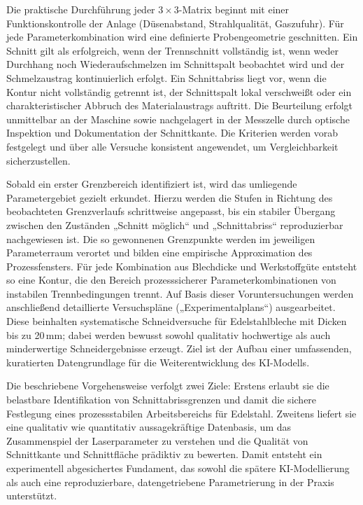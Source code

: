 Die praktische Durchführung jeder $3\times 3$-Matrix beginnt mit einer Funktionskontrolle der Anlage (Düsenabstand, Strahlqualität, Gaszufuhr). Für jede Parameterkombination wird eine definierte Probengeometrie geschnitten. Ein Schnitt gilt als erfolgreich, wenn der Trennschnitt vollständig ist, wenn weder Durchhang noch Wiederaufschmelzen im Schnittspalt beobachtet wird und der Schmelzaustrag kontinuierlich erfolgt. Ein Schnittabriss liegt vor, wenn die Kontur nicht vollständig getrennt ist, der Schnittspalt lokal verschweißt oder ein charakteristischer Abbruch des Materialaustrags auftritt. Die Beurteilung erfolgt unmittelbar an der Maschine sowie nachgelagert in der Messzelle durch optische Inspektion und Dokumentation der Schnittkante. Die Kriterien werden vorab festgelegt und über alle Versuche konsistent angewendet, um Vergleichbarkeit sicherzustellen.

Sobald ein erster Grenzbereich identifiziert ist, wird das umliegende Parametergebiet gezielt erkundet. Hierzu werden die Stufen in Richtung des beobachteten Grenzverlaufs schrittweise angepasst, bis ein stabiler Übergang zwischen den Zuständen „Schnitt möglich“ und „Schnittabriss“ reproduzierbar nachgewiesen ist. Die so gewonnenen Grenzpunkte werden im jeweiligen Parameterraum verortet und bilden eine empirische Approximation des Prozessfensters. Für jede Kombination aus Blechdicke und Werkstoffgüte entsteht so eine Kontur, die den Bereich prozesssicherer Parameterkombinationen von instabilen Trennbedingungen trennt. Auf Basis dieser Voruntersuchungen werden anschließend detaillierte Versuchspläne („Experimentalplans“) ausgearbeitet. Diese beinhalten systematische Schneidversuche für Edelstahlbleche mit Dicken bis zu 20\,mm; dabei werden bewusst sowohl qualitativ hochwertige als auch minderwertige Schneidergebnisse erzeugt. Ziel ist der Aufbau einer umfassenden, kuratierten Datengrundlage für die Weiterentwicklung des KI-Modells.

Die beschriebene Vorgehensweise verfolgt zwei Ziele: Erstens erlaubt sie die belastbare Identifikation von Schnittabrissgrenzen und damit die sichere Festlegung eines prozessstabilen Arbeitsbereichs für Edelstahl. Zweitens liefert sie eine qualitativ wie quantitativ aussagekräftige Datenbasis, um das Zusammenspiel der Laserparameter zu verstehen und die Qualität von Schnittkante und Schnittfläche prädiktiv zu bewerten. Damit entsteht ein experimentell abgesichertes Fundament, das sowohl die spätere KI-Modellierung als auch eine reproduzierbare, datengetriebene Parametrierung in der Praxis unterstützt.
